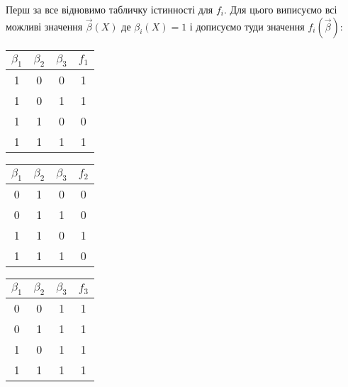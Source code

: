 \begin{solution}
    Перш за все відновимо табличку істинності для $f_i$. Для цього виписуємо всі можливі значення $\vec \beta(X)$ де $\beta_i(X) = 1$ і дописуємо туди значення $f_i(\vec \beta)$:
    
    \begin{table}[H]
        \centering
        \begin{tabular}[t]{|c|c|c|c|}
            \hline
            $\beta_1$ & $\beta_2$ & $\beta_3$ & $f_1$ \\ \hline
            1 & 0 & 0 & 1 \\
            1 & 0 & 1 & 1 \\
            1 & 1 & 0 & 0 \\
            1 & 1 & 1 & 1 \\ \hline
        \end{tabular}
        \hfill
        \begin{tabular}[t]{|c|c|c|c|}
            \hline
            $\beta_1$ & $\beta_2$ & $\beta_3$ & $f_2$ \\ \hline
            0 & 1 & 0 & 0 \\
            0 & 1 & 1 & 0 \\
            1 & 1 & 0 & 1 \\
            1 & 1 & 1 & 0 \\ \hline
        \end{tabular}
        \hfill
        \begin{tabular}[t]{|c|c|c|c|}
            \hline
            $\beta_1$ & $\beta_2$ & $\beta_3$ & $f_3$ \\ \hline
            0 & 0 & 1 & 1 \\
            0 & 1 & 1 & 1 \\
            1 & 0 & 1 & 1 \\
            1 & 1 & 1 & 1 \\ \hline
        \end{tabular}
    \end{table}
    

\end{solution}

